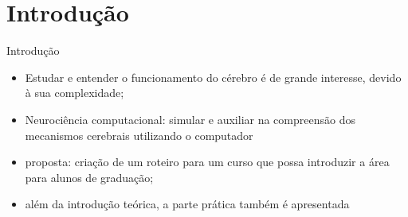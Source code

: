\section{Introdução}
\begin{frame}{Introdução}
	\begin{itemize}
		\item Estudar e entender o funcionamento do cérebro é de grande interesse, devido à sua complexidade;
		\item Neurociência computacional: simular e auxiliar na compreensão dos mecanismos cerebrais utilizando o computador
		\item proposta: criação de um roteiro para um curso que possa introduzir a área para alunos de graduação;
		\item além da introdução teórica, a parte prática também é apresentada
	\end{itemize}
\end{frame}
